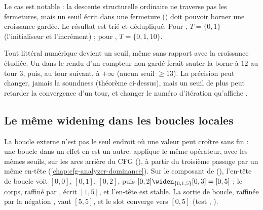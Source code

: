 
Le cas  est notable : la descente structurelle ordinaire ne
traverse pas les fermetures, mais un seuil écrit dans une fermeture
() doit pouvoir borner une
croissance gardée. Le résultat est trié et dédupliqué. Pour ,
$T = \{0, 1\}$ (l'initialiseur et l'incrément) ; pour ,
$T = \{0, 1, 10\}$.

\begin{piege}
  Tout littéral numérique devient un seuil, même sans rapport avec la
  croissance étudiée. Un  dans le rendu d'un compteur non
  gardé ferait sauter la borne à $12$ au tour 3, puis, au tour suivant, à
  $+\infty$ (aucun seuil $\ge 13$). La précision peut changer, jamais la
  soundness (théorème ci-dessus), mais un seuil de plus peut retarder la
  convergence d'un tour, et changer le numéro d'itération qu'affiche
  .
\end{piege}

\subsection{Le même widening dans les boucles locales}

La boucle externe n'est pas le seul endroit où une valeur peut croître sans
fin : une boucle  dans un effet en est un autre. 
applique le même opérateur, avec les mêmes seuils, sur les arcs arrière du
CFG (), à partir du troisième passage
par un même en-tête (\cref{chap:cfg-analyzer-dominance}). Sur le composant
 de 
(), l'en-tête de
boucle voit $[0,0]$, $[0,1]$, $[0,2]$, puis $[0,2] \widen_{\{0,1,5\}} [0,3] =
[0,5]$ ; le corps, raffiné par , écrit $[1,5]$, et l'en-tête est
stable. La sortie de boucle, raffinée par la négation , vaut
$[5,5]$, et le slot  converge vers $[0,5]$
(test ,
).

